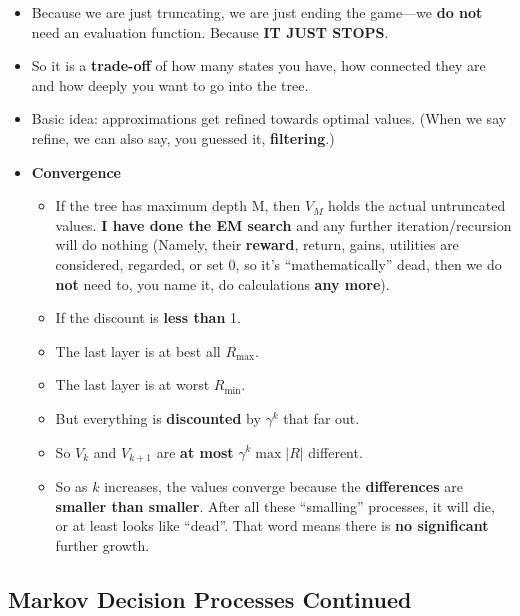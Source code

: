 \documentclass[twocolumn]{article}
\begin{document}
\begin{itemize}
\item Because we are just truncating, we are just ending the game---we
  \textbf{do not} need an evaluation function. Because \textbf{IT JUST
  STOPS}.
\item So it is a \textbf{trade-off} of how many states you have, how
  connected they are and how deeply you want to go into the tree.
\item Basic idea: approximations get refined towards optimal
  values. (When we say refine, we can also say, you guessed it,
  \textbf{filtering}.) 
\item \textbf{Convergence}
  \begin{itemize}
  \item If the tree has maximum depth M, then $V_{M}$ holds the actual
    untruncated values. \textbf{I have done the EM search} and any
    further iteration/recursion will do nothing (Namely, their
    \textbf{reward}, return, gains, utilities are considered,
    regarded, or set $0$, so it's ``mathematically'' dead, then we do
    \textbf{not} need to, you name it, do calculations \textbf{any
      more}). 
  \item If the discount is \textbf{less than} 1.
  \item The last layer is at best all $R_{\max}$.
  \item The last layer is at worst $R_{\min}$.
  \item But everything is \textbf{discounted} by $\gamma^{k}$ that far
    out. 
  \item So $V_{k}$ and $V_{k+1}$ are \textbf{at most} $\gamma^{k} \max
    |R|$ different.
  \item So as $k$ increases, the values converge because the
    \textbf{differences} are \textbf{smaller than smaller}. After all
    these ``smalling'' processes, it will die, or at least looks like
    ``dead''. That word means there is \textbf{no significant} further
    growth. 
  \end{itemize}
\end{itemize}

\subsection{Markov Decision Processes Continued}
\label{sec:mark-decis-proc-1}
\end{document}
